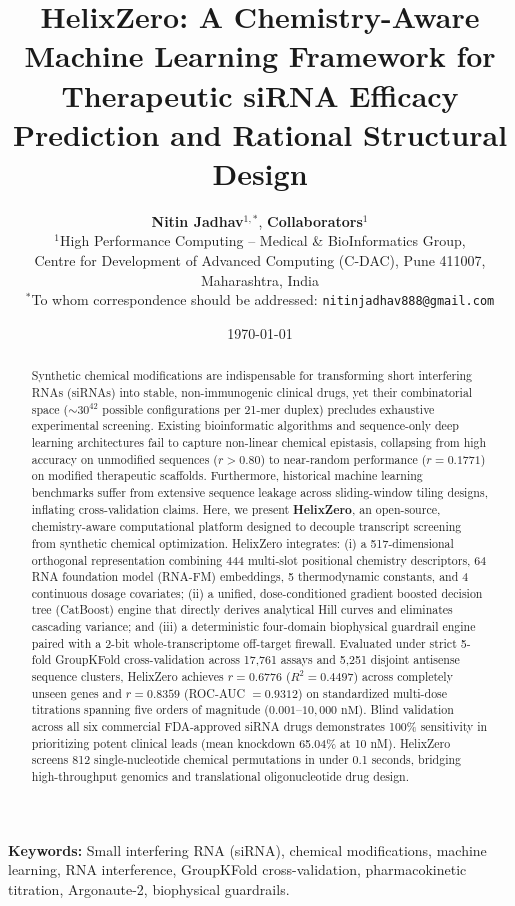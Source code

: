 \documentclass[twocolumn]{article}
\title{\textbf{HelixZero: A Chemistry-Aware Machine Learning Framework for Therapeutic siRNA Efficacy Prediction and Rational Structural Design}}
\author{
    \textbf{Nitin Jadhav}$^{1,*}$, \textbf{Collaborators}$^{1}$ \\
    $^{1}$High Performance Computing -- Medical \& BioInformatics Group, \\
    Centre for Development of Advanced Computing (C-DAC), Pune 411007, Maharashtra, India \\
    $^{*}$To whom correspondence should be addressed: \texttt{nitinjadhav888@gmail.com}
}
\date{\today}
\begin{document}
\maketitle

\begin{abstract}
\noindent
Synthetic chemical modifications are indispensable for transforming short interfering RNAs (siRNAs) into stable, non-immunogenic clinical drugs, yet their combinatorial space ($\sim 30^{42}$ possible configurations per 21-mer duplex) precludes exhaustive experimental screening. Existing bioinformatic algorithms and sequence-only deep learning architectures fail to capture non-linear chemical epistasis, collapsing from high accuracy on unmodified sequences ($r > 0.80$) to near-random performance ($r = 0.1771$) on modified therapeutic scaffolds. Furthermore, historical machine learning benchmarks suffer from extensive sequence leakage across sliding-window tiling designs, inflating cross-validation claims. Here, we present \textbf{HelixZero}, an open-source, chemistry-aware computational platform designed to decouple transcript screening from synthetic chemical optimization. HelixZero integrates: (i) a 517-dimensional orthogonal representation combining 444 multi-slot positional chemistry descriptors, 64 RNA foundation model (RNA-FM) embeddings, 5 thermodynamic constants, and 4 continuous dosage covariates; (ii) a unified, dose-conditioned gradient boosted decision tree (CatBoost) engine that directly derives analytical Hill curves and eliminates cascading variance; and (iii) a deterministic four-domain biophysical guardrail engine paired with a 2-bit whole-transcriptome off-target firewall. Evaluated under strict 5-fold GroupKFold cross-validation across 17,761 assays and 5,251 disjoint antisense sequence clusters, HelixZero achieves $r = 0.6776$ ($R^2 = 0.4497$) across completely unseen genes and $r = 0.8359$ (ROC-AUC $= 0.9312$) on standardized multi-dose titrations spanning five orders of magnitude ($0.001\text{--}10{,}000\text{ nM}$). Blind validation across all six commercial FDA-approved siRNA drugs demonstrates 100\% sensitivity in prioritizing potent clinical leads (mean knockdown 65.04\% at 10 nM). HelixZero screens 812 single-nucleotide chemical permutations in under 0.1 seconds, bridging high-throughput genomics and translational oligonucleotide drug design.
\end{abstract}

\vspace{0.5em}
\noindent\textbf{Keywords:} Small interfering RNA (siRNA), chemical modifications, machine learning, RNA interference, GroupKFold cross-validation, pharmacokinetic titration, Argonaute-2, biophysical guardrails.
\end{document}
